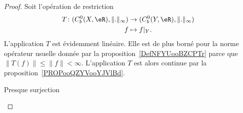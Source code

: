 \begin{proof}
    Soit l'opération de restriction
    \begin{equation}
        \begin{aligned}
            T\colon (C^0_b(X,\eR),\| . \|_{\infty})&\to (C^0_b(Y,\eR),\| . \|_{\infty}) \\
            f&\mapsto f|_Y.
        \end{aligned}
    \end{equation}
    L'application \( T\) est évidemment linéaire. Elle est de plus borné pour la norme opérateur usuelle donnée par la proposition~\ref{DefNFYUooBZCPTr} parce que \( \| T(f) \|\leq \| f \|<\infty\). L'application \( T\) est alors continue par la proposition~\ref{PROPooQZYVooYJVlBd}.

    \begin{subproof}
    \item[Presque surjection]


\end{subproof}
\end{proof}

